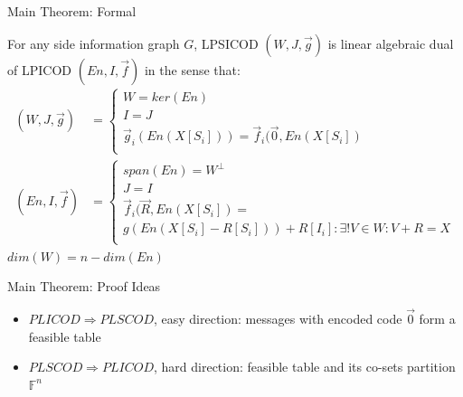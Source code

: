 \documentclass[xcolor=dvipsnames, aspectratio=169]{beamer}
\begin{document}
\begin{frame}{Main Theorem: Formal}
	\begin{theorem}
		For any side information graph $G$, LPSICOD $(W, J, \overrightarrow{g})$ is linear algebraic dual of LPICOD $(En, I, \overrightarrow{f})$ in the sense that:
		\begin{align*}
			(W, J, \overrightarrow{g}) &= \begin{cases}
				W = ker(En)\\
				I = J \\    
				\overrightarrow{g}_i(En(X[S_i])) = \overrightarrow{f}_i(\overrightarrow{0}, En(X[S_i])\\
			\end{cases} \\
			(En, I, \overrightarrow{f}) &= \begin{cases}
				span(En) = W^{\bot} \\
				J = I \\
				\overrightarrow{f}_i(\overrightarrow{R}, En(X[S_i]) =\\ g(En(X[S_i] - R[S_i])) + R[I_i]: \exists! V \in W: V + R = X \\
			\end{cases}
		\end{align*}
		$dim(W) = n - dim(En)$
	\end{theorem}
\end{frame}


\begin{frame}{Main Theorem: Proof Ideas}
	\begin{itemize}
		\item<1-> $PLICOD \Rightarrow PLSCOD$, easy direction: messages with encoded code $\overrightarrow{0}$ form a feasible table
		
		\item<2-> $PLSCOD \Rightarrow PLICOD$, hard direction: feasible table and its co-sets partition $\mathbb{F}^n$
	\end{itemize}
\end{frame}
\end{document}
